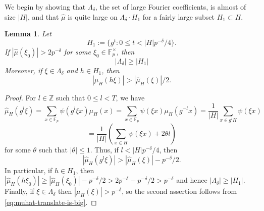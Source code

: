 \documentclass[11pt]{amsart}
\newtheorem{lem}[thm]{Lemma}
\newcommand{\fp}{\mathbb{F}_p}
\newcommand{\muh}{{\mu_H}}
\newcommand{\muhat}{{\widehat{\mu}}}
\newcommand{\Z}{{\mathbb{Z}}}
\begin{document}
We begin by showing that $\Lambda_\delta$, the set of large Fourier
coefficients, is almost of size $|H|$, and that $\muhat$ is quite
large on $\Lambda_\delta \cdot H_1 $ for a fairly large subset $H_1 \subset H$.
\begin{lem}
Let
$$
H_1 := \{ g^t : 0 \leq t < |H| p^{-\delta}/4\}.
$$
If $|\muhat(\xi_0)|>2 p^{-\delta}$ for some $\xi_0 \in \fp^\times$, then 
$$
|\Lambda_\delta| \geq |H_1|
$$
Moreover, if $\xi \in \Lambda_\delta$ and $h \in H_1$, then 
$$
|\muhat_H(h \xi)| > |\muhat_H(\xi)|/2.
$$
\end{lem}
\begin{proof}
For $l \in \Z$ such that $0 \leq l < T$, we have
$$
\muhat_H(g^l \xi) =   
\sum_{x \in \fp} \psi( g^l \xi x) \muh(x) 
=
\sum_{x \in \fp} \psi( \xi x) \muh(g^{-l}x) 
=
\frac{1}{|H|} 
\sum_{x \in g^l H} 
\psi( \xi x) 
$$
$$
=
\frac{1}{|H|} 
\left(
\sum_{x \in  H} 
\psi( \xi x) 
+ 2 \theta l
\right)
$$ 
for some $\theta$ such that $|\theta|\leq 1$. 
Thus, if  $l < |H|p^{-\delta}/4$, then 
\begin{equation}
  \label{eq:muhat-translate-is-big}
|\muhat_H( g^l\xi)| > |\muhat_H( \xi)| -  p^{-\delta}/2. 
\end{equation}
In particular, if $h \in H_1$, then  $|\muhat_H( h \xi_0)| \geq
|\muhat_H(\xi_0)| - 
p^{-\delta}/2 >  2 p^{-\delta} - p^{-\delta}/2 > 
p^{-\delta}$ and hence $|\Lambda_\delta| \geq |H_1|$.
%
Finally, if $\xi \in \Lambda_\delta$ then
$|\muhat_H(\xi)|>p^{-\delta}$, so the second assertion follows from
\eqref{eq:muhat-translate-is-big}. 
\end{proof}
\end{document}
